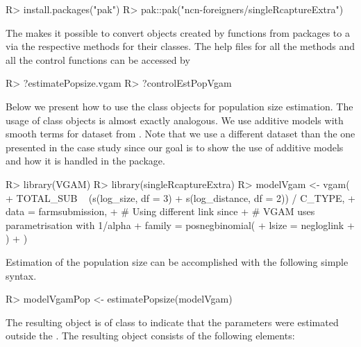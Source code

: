 \documentclass[
]{jss}
\newcommand{\1}{\mathcal{I}} \newcommand{\bZero}{\boldsymbol{0}}
\begin{document}
\begin{CodeChunk}
\begin{CodeInput}
R> install.packages("pak")
R> pak::pak("ncn-foreigners/singleRcaptureExtra")
\end{CodeInput}
\end{CodeChunk}

The  makes it possible to convert objects
created by  functions from packages
 to a  via the
respective  methods for their classes. The help
files for all the methods and all the control functions can be accessed
by

\begin{CodeChunk}
\begin{CodeInput}
R> ?estimatePopsize.vgam
R> ?controlEstPopVgam
\end{CodeInput}
\end{CodeChunk}

Below we present how to use the  class objects for
population size estimation. The usage of  class objects
is almost exactly analogous. We use additive models with smooth terms
for dataset from \cite{chao-generalization}. Note that we use a
different dataset than the one presented in the case study since our
goal is to show the use of additive models and how it is handled in the
 package.

\begin{CodeChunk}
\begin{CodeInput}
R> library(VGAM)
R> library(singleRcaptureExtra)
R> modelVgam <- vgam(
+   TOTAL_SUB ~ (s(log_size, df  = 3) + s(log_distance, df  = 2)) / C_TYPE,
+   data = farmsubmission,
+   # Using different link since
+   # VGAM uses parametrisation with 1/alpha
+   family = posnegbinomial(
+     lsize = negloglink
+   )
+ )
\end{CodeInput}
\end{CodeChunk}

Estimation of the population size can be accomplished with the following
simple syntax.

\begin{CodeChunk}
\begin{CodeInput}
R> modelVgamPop <- estimatePopsize(modelVgam)
\end{CodeInput}
\end{CodeChunk}

The resulting object is of class  to indicate that
the parameters were estimated outside the . The
resulting object consists of the following elements:
\end{document}
